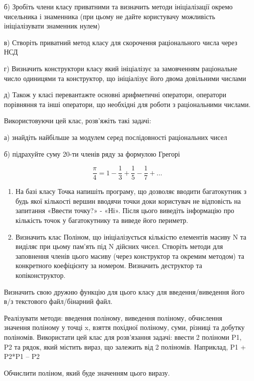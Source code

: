 \documentclass[]{article}
\begin{document}
б) Зробіть члени класу приватними та визначить методи ініціалізації
окремо чисельника і знаменника (при цьому не дайте користувачу
можливість ініціалізувати знаменник нулем)

в) Створіть приватний метод класу для скорочення раціонального числа
через НСД

г) Визначить конструктори класу який ініціалізує за замовченням
раціональне число одиницями та конструктор, що ініціалізує його двома
довільними числами

д) Також у класі перевантажте основні арифметичні оператори, оператори
порівняння та інші оператори, що необхідні для роботи з раціональними
числами.

Використовуючи цей клас, розв'яжіть такі задачі:

а) знайдіть найбільше за модулем серед послідовності раціональних чисел

б) підрахуйте суму 20-ти членів ряду за формулою Грегорі

\[\frac{\pi}{4} = 1 - \frac{1}{3} + \frac{1}{5} - \frac{1}{7} + \ldots\]

\begin{enumerate}
\def\labelenumi{\arabic{enumi})}
\item
  На базі класу Точка напишіть програму, що дозволяє вводити
  багатокутник з будь якої кількості вершин вводячи точки доки
  користувач не відповість на запитання «Ввести точку?» - «Ні». Після
  цього виведіть інформацію про кількість точок у багатокутнику та
  виведе його периметр.
\item
  Визначить клас Поліном, що ініціалізується кількістю елементів масиву
  N та виділяє при цьому пам'ять під N дійсних чисел. Створіть методи
  для заповнення членів цього масиву (через конструктор та окремим
  методом) та конкретного коефіцієнту за номером. Визначить деструктор
  та копіконструктор.
\end{enumerate}

Визначить свою дружню функцію для цього класу для введення/виведення
його в/з текстового файл/бінарний файл.

Реалізувати методи: введення поліному, виведення поліному, обчислення
значення поліному у точці x, взяття похідної поліному, суми, різниці та
добутку поліномів. Використати цей клас для розв'язання задачі: ввести 2
поліноми P1, P2 та рядок, який містить вираз, що залежить від 2
поліномів. Наприклад, P1 + P2*P1 -- P2

Обчислити поліном, який буде значенням цього виразу.
\end{document}
